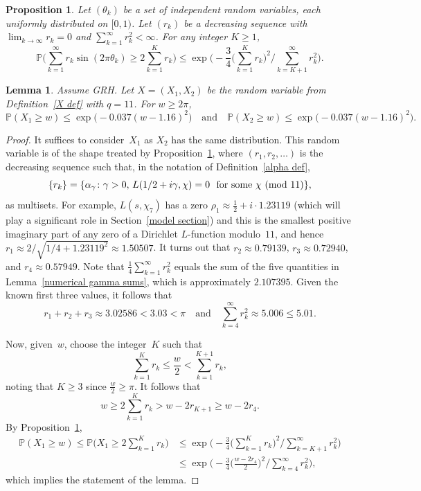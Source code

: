 \documentclass[11pt]{article}
\theoremstyle{plain}
\newtheorem{prop}[thm]{Proposition}
\newtheorem{lemma}[thm]{Lemma}
\theoremstyle{definition}
\numberwithin{equation}{section}
\renewcommand{\mod}[1]{{\ifmmode\text{\rm\ (mod~$#1$)}\else\discretionary{}{}{\hbox{\!\!}}\rm(mod~$#1$)\fi}}
\newcommand{\Xva}{X}
\newcommand{\0}{{\vec 0}}
\begin{document}
\begin{prop} \label{Montgomery tail}
Let $(\theta_k)$ be a set of independent random variables, each uniformly distributed on $[0,1)$. Let $(r_k)$ be a decreasing sequence with $\lim_{k\rightarrow \infty}r_k=0$ and $\sum_{k=1}^{\infty} r_{k}^{2} < \infty$.
For any integer $K \ge 1$,
\[
\mathbb{P}\biggl(\sum_{k=1}^{\infty} r_{k} \sin (2\pi \theta_{k}) \ge 2 \sum_{k=1}^{K} r_{k}\biggr) \le \exp \biggl(-\frac{3}{4} \biggl(\sum_{k=1}^{K} r_{k}\biggr)^{2} \bigg/ \sum_{k=K+1}^\infty r_{k}^{2} \biggr).
\]
\end{prop}

\begin{lemma}\label{new prob lemma}
Assume GRH.
Let $\Xva=(\Xva_1,\Xva_2)$ be the random variable from Definition~\ref{X def} with $q=11$. For $w\ge2\pi$,
\[
\mathbb{P}(X_1\ge w) \le \exp \bigl(-0.037(w-1.16)^{2}\bigr) \quad\text{and}\quad
\mathbb{P}(X_2\ge w) \le \exp \bigl(-0.037(w-1.16)^{2}\bigr).
\]
\end{lemma}

\begin{proof}
It suffices to consider~$X_1$ as $X_2$ has the same distribution. This random variable is of the shape treated by Proposition~\ref{Montgomery tail}, where $(r_1,r_2,\dots)$ is the decreasing sequence such that, in the notation of Definition~\ref{alpha def},
\[
\{r_k\} = \{\alpha_\gamma\colon \gamma>0, \,L(1/2+i\gamma, \chi)=0\,\,\text{ for some }\chi\mod{11}\},
\]
as multisets. For example, $L(s,\chi_7)$ has a zero $\rho_1 \approx \frac12+i\cdot 1.23119$ (which will play a significant role in Section~\ref{model section}) and this is the smallest positive imaginary part of any zero of a Dirichlet $L$-function modulo~$11$, and hence $r_1 \approx 2/\sqrt{1/4+1.23119^2} \approx 1.50507$. It turns out that $r_2\approx 0.79139$, $r_3\approx 0.72940$, and $r_4\approx 0.57949$. Note that $\frac14 \sum_{k=1}^\infty r_k^2$ equals the sum of the five quantities in Lemma~\ref{numerical gamma sums}, which is approximately $2.107395$. Given the known first three values, it follows that
\[
r_1+r_2+r_3 \approx 3.02586 <3.03 < \pi
\quad\text{and}\quad
\sum_{k=4}^\infty r_{k}^{2} \approx 5.006 \le 5.01.
\]

Now, given~$w$, choose the integer~$K$ such that
\[
\sum_{k=1}^{K} r_{k} \le \frac w2 < \sum_{k=1}^{K+1} r_{k},
\]
noting that $K\ge3$ since $\frac w2\ge\pi$. It follows that
\[
w \ge 2\sum_{k=1}^{K} r_{k} > w - 2r_{K+1} \ge w - 2r_{4}.
\]
By Proposition~\ref{Montgomery tail},
\begin{align*}
\mathbb{P}(X_1 \ge w) \le \mathbb{P}\biggl(X_1 \ge 2 \sum_{k=1}^{K} r_{k}\biggr) &\le \exp \biggl(-\frac{3}{4} \biggl(\sum_{k=1}^{K} r_{k}\biggr)^{2} \bigg/ \sum_{k=K+1}^\infty r_{k}^{2} \biggr) \\
& \le \exp \biggl(-\frac{3}{4}\biggl( \frac{w-2r_4}2 \biggr)^{2} \bigg/ \sum_{k=4}^\infty r_{k}^{2}\biggr),
\end{align*}
which implies the statement of the lemma.
\end{proof}
\end{document}
